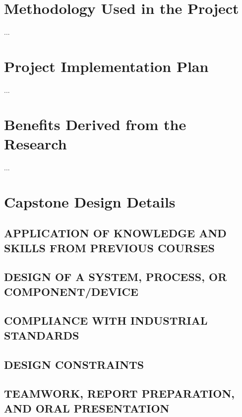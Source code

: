 \section{Methodology Used in the Project}
...
\section{Project Implementation Plan}
...
\section{Benefits Derived from the Research}
...
\section{Capstone Design Details}
\subsection{APPLICATION OF KNOWLEDGE AND SKILLS FROM PREVIOUS COURSES}
\subsection{DESIGN OF A SYSTEM, PROCESS, OR COMPONENT/DEVICE}
\subsection{COMPLIANCE WITH INDUSTRIAL STANDARDS}
\subsection{DESIGN CONSTRAINTS}
\subsection{TEAMWORK, REPORT PREPARATION, AND ORAL PRESENTATION}